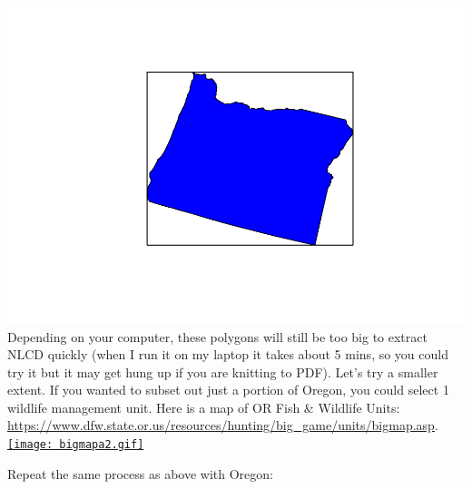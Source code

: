 \documentclass[
]{article}
\begin{document}
\includegraphics{lab3_patch_design_files/figure-latex/unnamed-chunk-2-4.pdf}
Depending on your computer, these polygons will still be too big to
extract NLCD quickly (when I run it on my laptop it takes about 5 mins,
so you could try it but it may get hung up if you are knitting to PDF).
Let's try a smaller extent. If you wanted to subset out just a portion
of Oregon, you could select 1 wildlife management unit. Here is a map of
OR Fish \& Wildlife Units:
\url{https://www.dfw.state.or.us/resources/hunting/big_game/units/bigmap.asp}.
\href{https://www.dfw.state.or.us/resources/hunting/big_game/units/images/bigmapa2.gif}{\texttt{[image: bigmapa2.gif]}}

Repeat the same process as above with Oregon:
\end{document}
